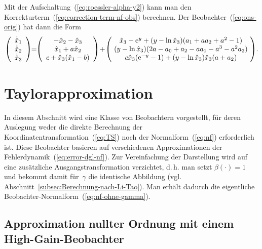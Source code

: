 \begin{example}
Mit der Aufschaltung~(\ref{eq:roessler-alpha-y2}) kann man den Korrekturterm~(\ref{eq:correction-term-nf-obs})
berechnen. Der Beobachter~(\ref{eq:ons-orig}) hat dann die Form
\[
\left(\begin{array}{c}
\dot{\hat{x}}_{1}\\
\dot{\hat{x}}_{2}\\
\dot{\hat{x}}_{3}
\end{array}\right)\!\!=\!\!\left(\begin{array}{c}
-\hat{x}_{2}-\hat{x}_{3}\\
\hat{x}_{1}+a\hat{x}_{2}\\
c+\hat{x}_{3}(\hat{x}_{1}-b)
\end{array}\right)\!+\!\left(\begin{array}{c}
\hat{x}_{3}-\e^{y}+(y-\ln\hat{x}_{3})(a_{1}+aa_{2}+a^{2}-1)\\
\!(y-\ln\hat{x}_{3})(2a-a_{0}+a_{2}-aa_{1}-a^{3}-a^{2}a_{2})\!\\
c\hat{x}_{3}(\e^{-y}-1)+(y-\ln\hat{x}_{3})\hat{x}_{3}(a+a_{2})
\end{array}\right)\!.
\]
\end{example}

\section{Taylorapproximation\label{sec:Approximation-of-observers}}

In diesem Abschnitt wird eine Klasse von Beobachtern vorgestellt,
für deren Auslegung weder die direkte Berechnung der Koordinatentransformation~(\ref{eq:TS})
noch der Normalform~(\ref{eq:nf}) erforderlich ist. Diese Beobachter
basieren auf verschiedenen Approximationen der Fehlerdynamik~(\ref{eq:error-dgl-nf}).
Zur Vereinfachung der Darstellung wird auf eine zusätzliche Ausgangstransformation
verzichtet, d.\,h. man setzt $\beta(\cdot)=1$ und bekommt damit
für~$\gamma$ die identische Abbildung (vgl. Abschnitt~\ref{subsec:Berechnung-nach-Li-Tao}).
Man erhält dadurch die eigentliche Beobachter-Normalform~(\ref{eq:nf-ohne-gamma}).

\subsection{Approximation nullter Ordnung mit einem High-Gain-Beobachter\label{subsec:Approximation-nullter-Ordnung}}

